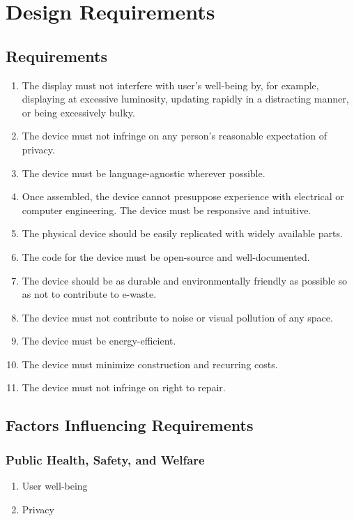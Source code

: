 \clearpage
\section{Design Requirements}
\subsection{Requirements}
\begin{enumerate}
      \item The display must not interfere with
            user's well-being by, for example, displaying at
            excessive luminosity, updating rapidly
            in a distracting manner, or being
            excessively bulky.
      \item The device must not infringe on any person's
            reasonable expectation of privacy.
      \item The device must
            be language-agnostic wherever possible.
      \item Once assembled, the device cannot presuppose
            experience with electrical or computer engineering.
            The device must be responsive and intuitive.
      \item The physical device should be
            easily replicated with widely available
            parts.
      \item The code for the device must
            be open-source and well-documented.
      \item The device should be as durable and
            environmentally friendly as possible so as
            not to contribute to e-waste.
      \item The device must not contribute to noise
            or visual pollution of any space.
      \item The device must be energy-efficient.
      \item The device must minimize
            construction and recurring costs.
      \item The device must not infringe on
            right to repair.
\end{enumerate}

\clearpage

\subsection{Factors Influencing Requirements}
\subsubsection{Public Health, Safety, and Welfare}
\begin{enumerate}
      \item User well-being
      \item Privacy
\end{enumerate}

